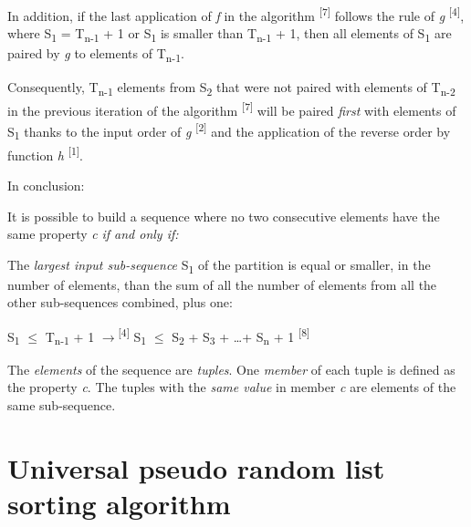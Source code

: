 \documentclass[12pt]{article}
\begin{document}
In addition, if the last application of \textit{f} in the algorithm\textsuperscript{ 
[7]} follows the rule of \textit{g} \textsuperscript{[4]}, where \textbar{}S\textsubscript{1}\textbar{} 
= \textbar{}T\textsubscript{n-1}\textbar{} + 1 or \textbar{}S\textsubscript{1}\textbar{} 
is smaller than \textbar{}T\textsubscript{n-1}\textbar{} + 1, then all elements 
of S\textsubscript{1} are paired by \textit{g} to elements of T\textsubscript{n-1}.

Consequently, T\textsubscript{n-1} elements from S\textsubscript{2} that were not 
paired with elements of T\textsubscript{n-2} in the previous iteration of the algorithm\textsuperscript{ 
[7]} will be paired \textit{first} with elements of S\textsubscript{1} thanks to the input 
order of \textit{g} \textsuperscript{[2]} and the application of the reverse order by function \textit{h} 
\textsuperscript{[1]}. 

In conclusion:

It is possible to build a sequence where no two consecutive elements have the same 
property \textit{c} \textit{if and only if:}

The \textit{largest input sub-sequence} S\textsubscript{1} of the partition is equal or smaller, in 
the number of elements, than the sum of all the number of elements from all the 
other sub-sequences combined, plus one:

\begin{center}
\textbar{}S\textsubscript{1}\textbar{} $\leq$ \textbar{}T\textsubscript{n-1}\textbar{} 
+ 1 $\longrightarrow$\textsuperscript{[4]} \textbar{}S\textsubscript{1}\textbar{} 
$\leq$ \textbar{}S\textsubscript{2}\textbar{} + \textbar{}S\textsubscript{3}\textbar{} 
+ \ldots + \textbar{}S\textsubscript{n}\textbar{} + 1 \textsuperscript{[8]}
\end{center}

\textsuperscript{\textdagger} The \textit{elements} of the sequence are \textit{tuples}. One \textit{member} of each tuple is defined as the property \textit{c}. The tuples with the \textit{same value} in member \textit{c} are elements of the same sub-sequence.

\section*{Universal pseudo random list sorting algorithm}
\end{document}
